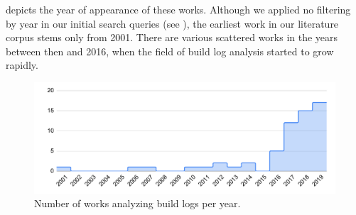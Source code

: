  depicts the year of appearance of these
works.
Although we applied no filtering by year in our initial search queries
(see ), the earliest work in our literature corpus
stems only from 2001.
There are various scattered works in the years between then and 2016,
when the field of build log analysis started to grow rapidly.

\begin{figure}[tbp]
		\centering
		\includegraphics[width=\columnwidth,
		clip]{img/lit-sur/years.pdf}
		\caption{Number of works analyzing build logs per year.}
		\label{fig:lit-years}
\end{figure}



